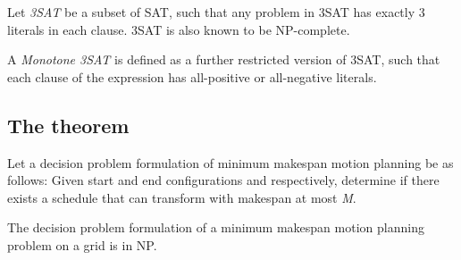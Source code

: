 \begin{definition}
	Let \emph{3SAT} be a subset of SAT, such that any problem in 3SAT has exactly 3 literals in each clause. 3SAT is also known to be NP-complete.
\end{definition}

\begin{definition}
	A \emph{Monotone 3SAT} is defined as a further restricted version of 3SAT, such that each clause of the expression has all-positive or all-negative literals. 
\end{definition}



\subsection{The theorem}


Let a decision problem formulation of minimum makespan motion planning be as follows: Given start and end configurations  and  respectively, determine if there exists a schedule that can transform  with makespan at most \emph{M}.

\begin{lemma}\label{lemma:np}
	The decision problem formulation of a minimum makespan motion planning problem on a grid is in NP.
\end{lemma}

